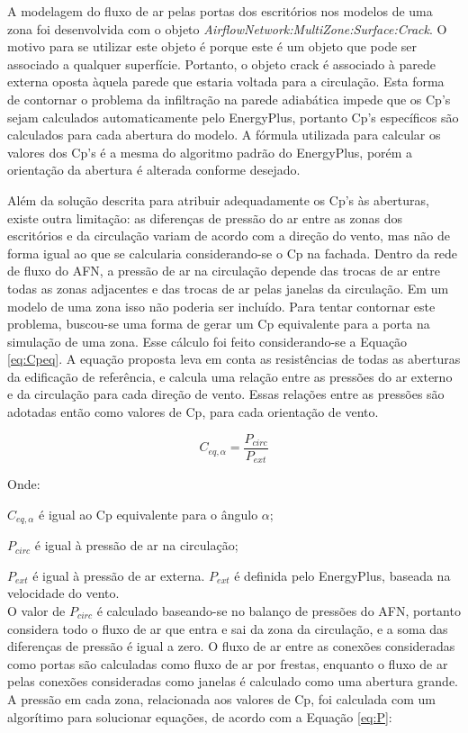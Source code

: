 \documentclass[brazil,hardcopy,openany,a5paper]{ufscthesis}
\begin{document}
		A modelagem do fluxo de ar pelas portas dos escritórios nos modelos de uma zona foi desenvolvida com o objeto \textit{AirflowNetwork:MultiZone:Surface:Crack}. O motivo para se utilizar este objeto é porque este é um objeto que pode ser associado a qualquer superfície. Portanto, o objeto crack é associado à parede externa oposta àquela parede que estaria voltada para a circulação.		
		Esta forma de contornar o problema da infiltração na parede adiabática impede que os Cp's sejam calculados automaticamente pelo EnergyPlus, portanto Cp's específicos são calculados para cada abertura do modelo. A fórmula utilizada para calcular os valores dos Cp's é a mesma do algoritmo padrão do EnergyPlus, porém a orientação da abertura é alterada conforme desejado.
		
		Além da solução descrita para atribuir adequadamente os Cp's às aberturas, existe outra limitação: as diferenças de pressão do ar entre as zonas dos escritórios e da circulação variam de acordo com a direção do vento, mas não de forma igual ao que se calcularia considerando-se o Cp na fachada.
		Dentro da rede de fluxo do AFN, a pressão de ar na circulação depende das trocas de ar entre todas as zonas adjacentes e das trocas de ar pelas janelas da circulação.
		Em um modelo de uma zona isso não poderia ser incluído. Para tentar contornar este problema, buscou-se uma forma de gerar um Cp equivalente para a porta na simulação de uma zona. Esse cálculo foi feito considerando-se a Equação \ref{eq:Cpeq}. A equação proposta leva em conta as resistências de todas as aberturas da edificação de referência, e calcula uma relação entre as pressões do ar externo e da circulação para cada direção de vento. Essas relações entre as pressões são adotadas então como valores de Cp, para cada orientação de vento.
		
		\begin{equation}\label{eq:Cpeq}
		C_{eq,\alpha} = \frac{P_{circ}}{P_{ext}}
		\end{equation}
		
		Onde:
		
		 $C_{eq,\alpha}$ é igual ao Cp equivalente para o ângulo $\alpha$;
		 
		 $P_{circ}$ é igual à pressão de ar na circulação;
		 
		 $P_{ext}$ é igual à pressão de ar externa. $P_{ext}$ é definida pelo EnergyPlus, baseada na velocidade do vento.
		 \\
		 
		 O valor de $P_{circ}$ é calculado baseando-se no balanço de pressões do AFN, portanto considera todo o fluxo de ar que entra e sai da zona da circulação, e a soma das diferenças de pressão é igual a zero.
		 O fluxo de ar entre as conexões consideradas como portas são calculadas como fluxo de ar por frestas, enquanto o fluxo de ar pelas conexões consideradas como janelas é calculado como uma abertura grande.
		 A pressão em cada zona, relacionada aos valores de Cp, foi calculada com um algorítimo para solucionar equações, de acordo com a Equação \ref{eq:P}:
		 
\end{document}
